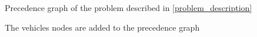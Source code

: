 \documentclass[journal]{IEEEtran}
\let\MYoriglatexcaption\caption
\renewcommand{\caption}[2][\relax]{\MYoriglatexcaption[#2]{#2}}
\begin{document}
\begin{figure}[!h]
	\caption{Precedence graph of the problem described in
\ref{problem_description}}
	\label{precedence}
\end{figure}

\begin{figure}[!h]
	\caption{The vehicles nodes are added to the precedence graph}
	\label{precedence_with_vehicles}
\end{figure}
\end{document}
